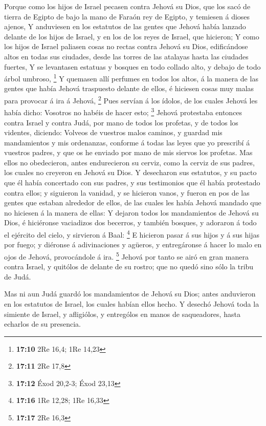  Porque como los hijos de Israel pecasen contra Jehová su
Dios, que los sacó de tierra de Egipto de bajo la mano de Faraón rey de
Egipto, y temiesen á dioses ajenos,  Y anduviesen en los
estatutos de las gentes que Jehová había lanzado delante de los hijos de
Israel, y en los de los reyes de Israel, que hicieron;  Y
como los hijos de Israel paliasen cosas no rectas contra Jehová su Dios,
edificándose altos en todas sus ciudades, desde las torres de las
atalayas hasta las ciudades fuertes,  Y se levantasen
estatuas y bosques en todo collado alto, y debajo de todo árbol umbroso,
\footnote{\textbf{17:10} 2Re 16,4; 1Re 14,23}  Y quemasen
allí perfumes en todos los altos, á la manera de las gentes que había
Jehová traspuesto delante de ellos, é hiciesen cosas muy malas para
provocar á ira á Jehová, \footnote{\textbf{17:11} 2Re 17,8}
 Pues servían á los ídolos, de los cuales Jehová les
había dicho: Vosotros no habéis de hacer esto; \footnote{\textbf{17:12}
  Éxod 20,2-3; Éxod 23,13}  Jehová protestaba entonces
contra Israel y contra Judá, por mano de todos los profetas, y de todos
los videntes, diciendo: Volveos de vuestros malos caminos, y guardad mis
mandamientos y mis ordenanzas, conforme á todas las leyes que yo
prescribí á vuestros padres, y que os he enviado por mano de mis siervos
los profetas.  Mas ellos no obedecieron, antes
endurecieron su cerviz, como la cerviz de sus padres, los cuales no
creyeron en Jehová su Dios.  Y desecharon sus estatutos,
y su pacto que él había concertado con sus padres, y sus testimonios que
él había protestado contra ellos; y siguieron la vanidad, y se hicieron
vanos, y fueron en pos de las gentes que estaban alrededor de ellos, de
las cuales les había Jehová mandado que no hiciesen á la manera de
ellas:  Y dejaron todos los mandamientos de Jehová su
Dios, é hiciéronse vaciadizos dos becerros, y también bosques, y
adoraron á todo el ejército del cielo, y sirvieron á Baal: \footnote{\textbf{17:16}
  1Re 12,28; 1Re 16,33}  E hicieron pasar á sus hijos y á
sus hijas por fuego; y diéronse á adivinaciones y agüeros, y
entregáronse á hacer lo malo en ojos de Jehová, provocándole á ira.
\footnote{\textbf{17:17} 2Re 16,3}  Jehová por tanto se
airó en gran manera contra Israel, y quitólos de delante de su rostro;
que no quedó sino sólo la tribu de Judá.

 Mas ni aun Judá guardó los mandamientos de Jehová su
Dios; antes anduvieron en los estatutos de Israel, los cuales habían
ellos hecho.  Y desechó Jehová toda la simiente de
Israel, y afligiólos, y entrególos en manos de saqueadores, hasta
echarlos de su presencia.

